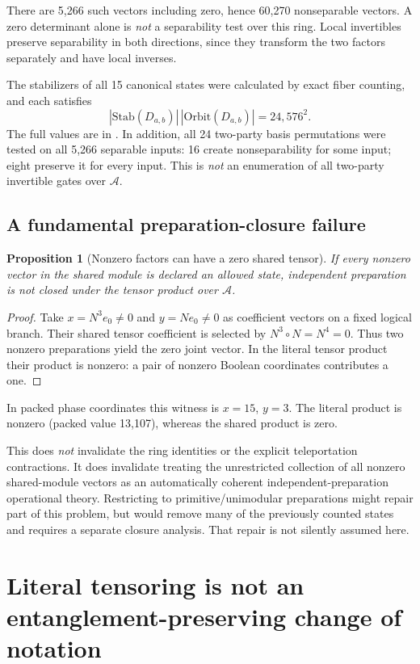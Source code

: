 \documentclass[11pt,a4paper]{article}
\newtheorem{proposition}[theorem]{Proposition}
\theoremstyle{definition}\newtheorem{definition}[theorem]{Definition}
\newcommand{\A}{\mathcal A}
\newcommand{\file}[1]{\path{#1}}
\begin{document}
There are 5,266 such vectors including zero, hence 60,270 nonseparable vectors. A zero determinant alone is \emph{not} a separability test over this ring. Local invertibles preserve separability in both directions, since they transform the two factors separately and have local inverses.

The stabilizers of all 15 canonical states were calculated by exact fiber counting, and each satisfies
\[
 |\mathrm{Stab}(D_{a,b})|\,|\mathrm{Orbit}(D_{a,b})|=24,576^2.
\]
The full values are in \file{data/local_stabilizers_audited.csv}. In addition, all 24 two-party basis permutations were tested on all 5,266 separable inputs: 16 create nonseparability for some input; eight preserve it for every input. This is \emph{not} an enumeration of all two-party invertible gates over $\A$.

\subsection{A fundamental preparation-closure failure}
\begin{proposition}[Nonzero factors can have a zero shared tensor]
If every nonzero vector in the shared module is declared an allowed state, independent preparation is not closed under the tensor product over $\A$.
\end{proposition}
\begin{proof}
Take $x=N^3e_0\ne0$ and $y=Ne_0\ne0$ as coefficient vectors on a fixed logical branch. Their shared tensor coefficient is selected by $N^3\circ N=N^4=0$. Thus two nonzero preparations yield the zero joint vector. In the literal tensor product their product is nonzero: a pair of nonzero Boolean coordinates contributes a one.
\end{proof}
In packed phase coordinates this witness is $x=15$, $y=3$. The literal product is nonzero (packed value 13,107), whereas the shared product is zero.

This does \emph{not} invalidate the ring identities or the explicit teleportation contractions. It does invalidate treating the unrestricted collection of all nonzero shared-module vectors as an automatically coherent independent-preparation operational theory. Restricting to primitive/unimodular preparations might repair part of this problem, but would remove many of the previously counted states and requires a separate closure analysis. That repair is not silently assumed here.

\section{Literal tensoring is not an entanglement-preserving change of notation}
\end{document}
